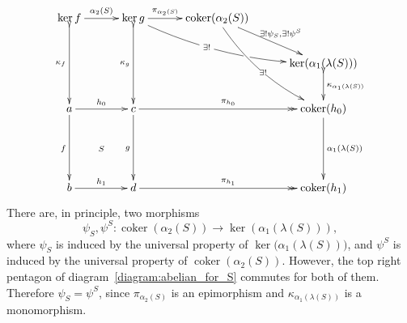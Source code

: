 \documentclass[12pt,leqno]{amsart}
\theoremstyle{definition}
\newcommand{\eK}{\alpha_2}%
\newcommand{\eC}{\alpha_1}%
\newcommand{\4}{\texttt{4}}
\DeclareMathOperator{\coker}{coker}
\begin{document}
\begin{equation}
\label{diagram:abelian_for_S}
\xymatrix@C=3em{
\ker f \ar[r]^{\alpha_2(S)} \ar@{>->}[dd]_{\kappa_f}
& \ker g \ar@{>->}[dd]_{\kappa_g} 
\ar[r]^(.38){\pi_{\alpha_2(S)}} 
\ar@/_1em/[rrd]|(.4){\ \exists !\ }|(.61)\hole   
& \coker(\alpha_2(S))  \ar@/_1em/[ddr] |{\ \exists ! \ }
 \ar[dr]^{\exists ! \psi_S, \exists ! \psi^S} 
\\
&&& \ker ( \alpha_1(\lambda(S))) \ar@{>->}[d]^{\kappa_{\alpha_1(\lambda(S))}}
\\
a \ar[r]^{h_0}\ar[dd]_f & \ar[dd]_g c \ar@{->>}[rr]^{\pi_{h_0}} && 
\coker (h_0) \ar[dd]^{\alpha_1(\lambda(S))}
\\
\ar@{}[r]|S &
\\
b \ar[r]^{h_1}& d  \ar@{->>}[rr]^{\pi_{h_1}} &&  \coker (h_1)
}
\end{equation}
There are, in principle, two morphisms
\[
\psi_S,\psi^S\colon \coker(\eK(S))\longrightarrow
\ker(\eC(\lambda(S))),
\]
where $\psi_S$ is induced by the universal
property of $\ker\big(\eC(\lambda(S))\big)$, and $\psi^S$ is induced
by the universal property of $\coker(\eK(S))$. However, the
top right pentagon of diagram~\eqref{diagram:abelian_for_S}
commutes for both of them. 
Therefore $\psi_S=\psi^S$, since $\pi_{\eK(S)}$ is an epimorphism and
$\kappa_{\eC(\lambda(S))}$ is a monomorphism.
\end{document}
